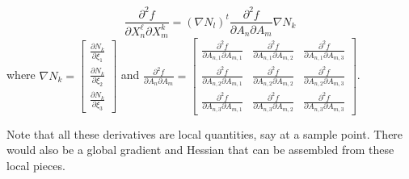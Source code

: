 \begin{equation} \label{eqn:vol-hess-mat}
\frac{\partial^2 f}{\partial X_n^\ell \partial X_m^k} =
(\nabla N_l)^t \frac{\partial^2 f}{\partial A_n \partial A_m} \nabla N_k
\end{equation}
where $\nabla N_k = \left[\begin{array}{c} 
\frac{\partial N_k}{\partial \xi_1} \\
\frac{\partial N_k}{\partial \xi_2} \\
\frac{\partial N_k}{\partial \xi_3} \end{array}\right]$ 
and $\frac{\partial^2 f}{\partial A_n \partial A_m} = \left[\begin{array}{ccc}
\frac{\partial^2 f}{\partial A_{n,1} \partial A_{m,1}} &
\frac{\partial^2 f}{\partial A_{n,1} \partial A_{m,2}} &
\frac{\partial^2 f}{\partial A_{n,1} \partial A_{m,3}} \\
\frac{\partial^2 f}{\partial A_{n,2} \partial A_{m,1}} &
\frac{\partial^2 f}{\partial A_{n,2} \partial A_{m,2}} &
\frac{\partial^2 f}{\partial A_{n,2} \partial A_{m,3}} \\
\frac{\partial^2 f}{\partial A_{n,3} \partial A_{m,1}} &
\frac{\partial^2 f}{\partial A_{n,3} \partial A_{m,2}} &
\frac{\partial^2 f}{\partial A_{n,3} \partial A_{m,3}} \end{array}\right]$.\newline


\noindent Note that all these derivatives are local quantities, say at a sample point.  There would also be a global gradient and Hessian that can be assembled from these local pieces. \newline

